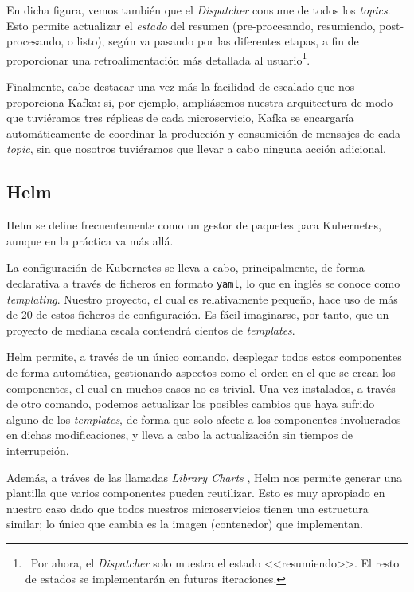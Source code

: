 En dicha figura, vemos también que el \emph{Dispatcher} consume de todos los \emph{topics}. Esto permite actualizar el \emph{estado} del resumen (pre-procesando, resumiendo, post-procesando, o listo), según va pasando por las diferentes etapas, a fin de proporcionar una retroalimentación más detallada al usuario\footnote{\, Por ahora, el \emph{Dispatcher} solo muestra el estado <<resumiendo>>. El resto de estados se implementarán en futuras iteraciones.}.

Finalmente, cabe destacar una vez más la facilidad de escalado que nos proporciona Kafka: si, por ejemplo, ampliásemos nuestra arquitectura de modo que tuviéramos tres réplicas de cada microservicio, Kafka se encargaría automáticamente de coordinar la producción y consumición de mensajes de cada \emph{topic}, sin que nosotros tuviéramos que llevar a cabo ninguna acción adicional.

\subsection{Helm}

Helm se define frecuentemente como un gestor de paquetes para Kubernetes, aunque en la práctica va más allá.

La configuración de Kubernetes se lleva a cabo, principalmente, de forma declarativa a través de ficheros en formato \texttt{yaml}, lo que en inglés se conoce como \emph{templating}. Nuestro proyecto, el cual es relativamente pequeño, hace uso de más de 20 de estos ficheros de configuración. Es fácil imaginarse, por tanto, que un proyecto de mediana escala contendrá cientos de \emph{templates}.

Helm permite, a través de un único comando, desplegar todos estos componentes de forma automática, gestionando aspectos como el orden en el que se crean los componentes, el cual en muchos casos no es trivial. Una vez instalados, a través de otro comando, podemos actualizar los posibles cambios que haya sufrido alguno de los \emph{templates}, de forma que solo afecte a los componentes involucrados en dichas modificaciones, y lleva a cabo la actualización sin tiempos de interrupción.

Además, a tráves de las llamadas \emph{Library Charts} \cite{helm-lib-charts}, Helm nos permite generar una plantilla que varios componentes pueden reutilizar. Esto es muy apropiado en nuestro caso dado que todos nuestros microservicios tienen una estructura similar; lo único que cambia es la imagen (contenedor) que implementan.


